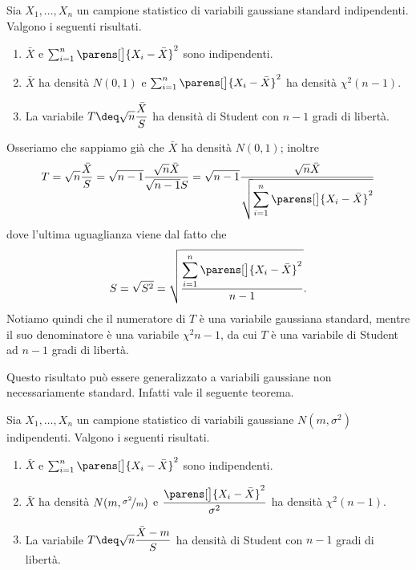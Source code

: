 \begin{theorem}
    Sia $X_1, \dots, X_n$ un campione statistico di variabili gaussiane standard indipendenti. Valgono i seguenti risultati.
    \begin{enumerate}[label={(\roman*)}]
        \item $\bar X$ e $\sum_{i=1}^n\parens[\big]{X_i - \bar X}^2$ sono indipendenti.
        \item $\bar X$ ha densità $N(0, 1)$ e $\sum_{i=1}^n\parens[\big]{X_i - \bar X}^2$ ha densità $\chi^2(n-1)$.
        \item La variabile $T \deq \sqrt{n} \dfrac{\bar X}{S}$ ha densità di Student con $n-1$ gradi di libertà. 
    \end{enumerate}
\end{theorem}

Osseriamo che sappiamo già che $\bar X$ ha densità $N(0, 1)$; inoltre \[
    T = \sqrt{n} \dfrac{\bar X}{S} = \sqrt{n-1} \frac{\sqrt{n} \bar X}{\sqrt{n-1} S} = \sqrt{n-1} \frac{\sqrt{n} \bar X}{\displaystyle \sqrt{\sum_{i=1}^n \parens[\big]{X_i - \bar X}^2}}
\] dove l'ultima uguaglianza viene dal fatto che \[
    S = \sqrt{S^2} = \sqrt{\frac{\displaystyle \sum_{i=1}^n \parens[\big]{X_i - \bar X}^2}{n-1}}.
\] Notiamo quindi che il numeratore di $T$ è una variabile gaussiana standard, mentre il suo denominatore è una variabile $\chi^2{n-1}$, da cui $T$ è una variabile di Student ad $n-1$ gradi di libertà.

Questo risultato può essere generalizzato a variabili gaussiane non necessariamente standard. Infatti vale il seguente teorema.

\begin{theorem}
    Sia $X_1, \dots, X_n$ un campione statistico di variabili gaussiane $N(m, \sigma^2)$ indipendenti. Valgono i seguenti risultati.
    \begin{enumerate}[label={(\roman*)}]
        \item $\bar X$ e $\sum_{i=1}^n\parens[\big]{X_i - \bar X}^2$ sono indipendenti.
        \item $\bar X$ ha densità $N(m, \nicefrac{\sigma^2}{m})$ e $\dfrac{\parens[\big]{X_i - \bar X}^2}{\sigma^2}$ ha densità $\chi^2(n-1)$.
        \item La variabile $T \deq \sqrt{n} \dfrac{\bar X - m}{S}$ ha densità di Student con $n-1$ gradi di libertà. 
    \end{enumerate}
\end{theorem}